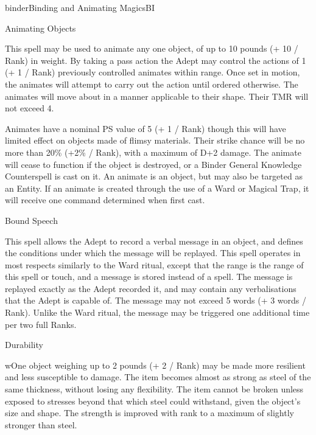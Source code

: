 \begin{College}[1.2]{binder}{Binding and Animating Magics}{BI}
\begin{spell}[G-2]{Animating Objects}
\begin{effects}
This spell may be used to animate any one object, of up to 10 pounds
(+ 10 / Rank) in weight.  By taking a pass action the Adept may
control the actions of 1 (+ 1 / Rank) previously controlled animates
within range.  Once set in motion, the animates will attempt to carry
out the action until ordered otherwise.  The animates will move about
in a manner applicable to their shape.  Their TMR will not exceed 4.

Animates have a nominal PS value of 5 (+ 1 / Rank) though this will
have limited effect on objects made of flimsy materials. Their strike
chance will be no more than 20\% (+2\% / Rank), with a maximum of D+2
damage. The animate will cease to function if the object is destroyed,
or a Binder General Knowledge Counterspell is cast on it.  An animate
is an object, but may also be targeted as an Entity. If an animate is
created through the use of a Ward or Magical Trap, it will receive one
command determined when first cast.
\end{effects}
\end{spell}

\begin{spell}[G-3]{Bound Speech}

\begin{effects}
This spell allows the Adept to record a verbal message in an object,
and defines the conditions under which the message will be replayed.
This spell operates in most respects similarly to the Ward ritual,
except that the range is the range of this spell or touch, and a
message is stored instead of a spell.  The message is replayed exactly
as the Adept recorded it, and may contain any verbalisations that the
Adept is capable of.  The message may not exceed 5 words (+ 3 words /
Rank).  Unlike the Ward ritual, the message may be triggered one
additional time per two full Ranks.
\end{effects}
\end{spell}

\begin{spell}[G-4]{Durability}

\begin{effects}
wOne object weighing up to 2 pounds (+ 2 / Rank) may be made more
resilient and less susceptible to damage.  The item becomes almost as
strong as steel of the same thickness, without losing any flexibility.
The item cannot be broken unless exposed to stresses beyond that which
steel could withstand, given the object’s size and shape.  The
strength is improved with rank to a maximum of slightly stronger than
steel.


\end{effects}
\end{spell}
\end{College}
